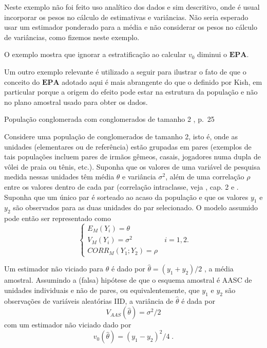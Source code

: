 \documentclass[]{book}
\theoremstyle{definition}
\theoremstyle{definition}
\theoremstyle{definition}
\theoremstyle{remark}
\let\BeginKnitrBlock\begin \let\EndKnitrBlock\end
\begin{document}
\BeginKnitrBlock{remark}
{}Neste exemplo não foi feito uso analítico
dos dados e sim descritivo, onde é usual incorporar os pesos no cálculo
de estimativas e variâncias. Não seria esperado usar um estimador
ponderado para a média e não considerar os pesos no cálculo de
variâncias, como fizemos neste exemplo.
\EndKnitrBlock{remark}

\BeginKnitrBlock{remark}
{}O exemplo mostra que ignorar a
estratificação ao calcular \(v_{0}\) diminui o \(\mathbf{EPA}\).
\EndKnitrBlock{remark}

Um outro exemplo relevante é utilizado a seguir para ilustrar o fato de
que o conceito do \(\mathbf{EPA}\) adotado aqui é mais abrangente do que
o definido por Kish, em particular porque a origem do efeito pode estar
na estrutura da população e não no plano amostral usado para obter os
dados.

\BeginKnitrBlock{example}
\protect\hypertarget{exm:exe43}{}{\label{exm:exe43} }População conglomerada
com conglomerados de tamanho 2 \citep{SHS89}, p.~25
\EndKnitrBlock{example}

Considere uma população de conglomerados de tamanho 2, isto é, onde as
unidades (elementares ou de referência) estão grupadas em pares
(exemplos de tais populações incluem pares de irmãos gêmeos, casais,
jogadores numa dupla de vôlei de praia ou tênis, etc.). Suponha que os
valores de uma variável de pesquisa medida nessas unidades têm média
\(\theta\) e variância \(\sigma ^{2}\), além de uma correlação \(\rho\)
entre os valores dentro de cada par (correlação intraclasse, veja
\citep{SilvaMou}, cap. 2 e \citep{haggard}. Suponha que um único par é
sorteado ao acaso da população e que os valores \(y_{1}\) e \(y_{2}\)
são observados para as duas unidades do par selecionado. O modelo
assumido pode então ser representado como \[
\left\{ 
\begin{array}{l}
E_{M}\left( Y_{i}\right) =\theta \\ 
V_{M}\left( Y_{i}\right) =\sigma ^{2} \\ 
CORR_{M}\left( Y_{1};Y_{2}\right) =\rho
\end{array}
\right. \;\;i=1,2. 
\]

Um estimador não viciado para \(\theta\) é dado por
\(\widehat{\theta }=(y_{1}+y_{2})/2\) , a média amostral. Assumindo a
(falsa) hipótese de que o esquema amostral é AASC de unidades
individuais e não de pares, ou equivalentemente, que \(y_{1}\) e
\(y_{2}\) são observações de variáveis aleatórias IID, a variância de
\(\widehat{\theta }\) é dada por \[
V_{AAS}\left( \widehat{\theta }\right) =\sigma ^{2}/2 
\] com um estimador não viciado dado por \[
v_{0}\left( \widehat{\theta }\right) =(y_{1}-y_{2})^{2}/4\;. 
\]
\end{document}
